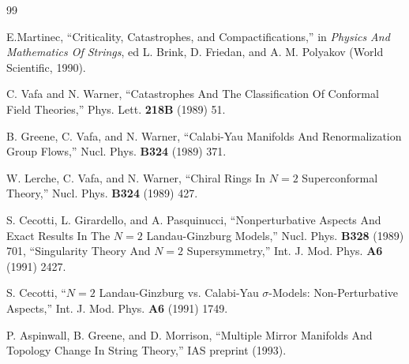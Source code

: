 \begin{thebibliography}{99}

 E.Martinec, ``Criticality, Catastrophes, and Compactifications,'' in \textit{Physics And Mathematics Of Strings}, ed L. Brink, D. Friedan, and A. M. Polyakov (World Scientific, 1990).

 C. Vafa and N. Warner, ``Catastrophes And The Classification Of Conformal Field Theories,'' Phys. Lett. \textbf{218B} (1989) 51.

 B. Greene, C. Vafa, and N. Warner, ``Calabi-Yau Manifolds And Renormalization Group Flows,'' Nucl. Phys. \textbf{B324} (1989) 371.

 W. Lerche, C. Vafa, and N. Warner, ``Chiral Rings In $N=2$ Superconformal Theory,'' Nucl. Phys. \textbf{B324} (1989) 427.

 S. Cecotti, L. Girardello, and A. Pasquinucci, ``Nonperturbative Aspects And Exact Results In The $N=2$ Landau-Ginzburg Models,'' Nucl. Phys. \textbf{B328} (1989) 701, ``Singularity Theory And $N=2$ Supersymmetry,'' Int. J. Mod. Phys. \textbf{A6} (1991) 2427.

 S. Cecotti, ``$N=2$ Landau-Ginzburg vs. Calabi-Yau $\sigma$-Models: Non-Perturbative Aspects,'' Int. J. Mod. Phys. \textbf{A6} (1991) 1749.

 P. Aspinwall, B. Greene, and D. Morrison, ``Multiple Mirror Manifolds And Topology Change In String Theory,'' IAS preprint (1993).


\end{thebibliography}
